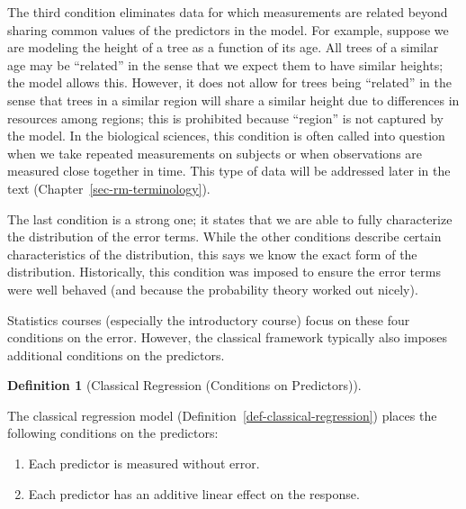 \documentclass[
  letterpaper,
  DIV=11,
  numbers=noendperiod]{scrreprt}
\providecommand{\tightlist}{%
  \setlength{\itemsep}{0pt}\setlength{\parskip}{0pt}}\usepackage{longtable,booktabs,array}
\theoremstyle{definition}
\theoremstyle{definition}
\newtheorem{definition}{Definition}[chapter]
\theoremstyle{remark}
\begin{document}
The third condition eliminates data for which measurements are related
beyond sharing common values of the predictors in the model. For
example, suppose we are modeling the height of a tree as a function of
its age. All trees of a similar age may be ``related'' in the sense that
we expect them to have similar heights; the model allows this. However,
it does not allow for trees being ``related'' in the sense that trees in
a similar region will share a similar height due to differences in
resources among regions; this is prohibited because ``region'' is not
captured by the model. In the biological sciences, this condition is
often called into question when we take repeated measurements on
subjects or when observations are measured close together in time. This
type of data will be addressed later in the text
(Chapter~\ref{sec-rm-terminology}).

The last condition is a strong one; it states that we are able to fully
characterize the distribution of the error terms. While the other
conditions describe certain characteristics of the distribution, this
says we know the exact form of the distribution. Historically, this
condition was imposed to ensure the error terms were well behaved (and
because the probability theory worked out nicely).

Statistics courses (especially the introductory course) focus on these
four conditions on the error. However, the classical framework typically
also imposes additional conditions on the predictors.

\begin{definition}[Classical Regression (Conditions on
Predictors)]\protect\hypertarget{def-classical-regression-cont}{}\label{def-classical-regression-cont}

The classical regression model
(Definition~\ref{def-classical-regression}) places the following
conditions on the predictors:

\begin{enumerate}
\def\labelenumi{\arabic{enumi}.}
\tightlist
\item
  Each predictor is measured without error.
\item
  Each predictor has an additive linear effect on the response.
\end{enumerate}

\end{definition}
\end{document}
